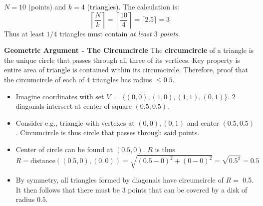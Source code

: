 \documentclass[../Main.tex]{subfiles}
\begin{document}
{\begin{itemize}
     $N=10$ (points) and $k=4$ (triangles). The calculation is:
\[
\left\lceil \frac{N}{k} \right\rceil = \left\lceil \frac{10}{4} \right\rceil = \lceil 2.5 \rceil = 3
\]
Thus at least $1/4$ triangles must contain \textit{at least $3$ points}.
\end{itemize}

\textbf{Geometric Argument - The Circumcircle}
The \textbf{circumcircle} of a triangle is the unique circle that passes through all three of its vertices. Key property is entire area of triangle is contained within its circumcircle. Therefore, proof that the circumcircle of each of $4$ triangles has radius $\leq 0.5$.
\begin{itemize}
    \item Imagine coordinates with set $V$ $=\{(0,0), (1,0), (1,1), (0,1)\}$. $2$ diagonals intersect at center of square $(0.5, 0.5)$.
    \item Consider e.g., triangle with vertexes at $(0,0), (0,1)$ and center $(0.5, 0.5)$. Circumcircle is thus circle that passes through said points.
    \item Center of circle can be found at $(0.5, 0)$. $R$ is thus 
    \[
        R = \text{distance}((0.5,0), (0,0)) = \sqrt{(0.5-0)^2 + (0-0)^2} = \sqrt{0.5^2} = 0.5
    \]
    \item By symmetry, all triangles formed by diagonals have circumcircle of $R=$ 0.5. It then follows that there must be $3$ points that can be covered by a disk of radius $0.5$.
\end{itemize}
}
\end{document}
